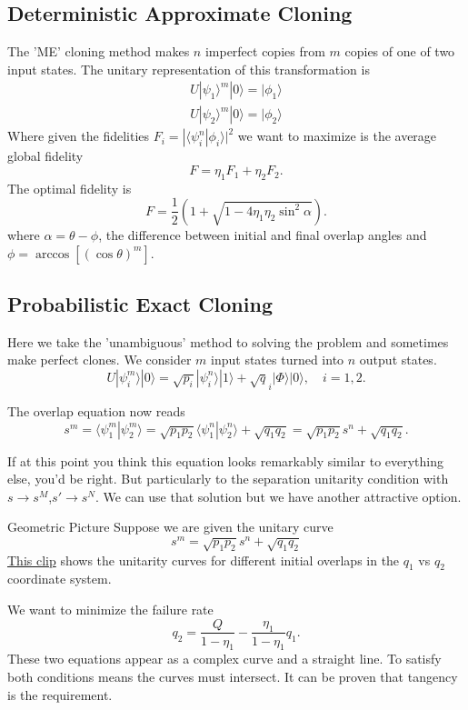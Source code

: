 \documentclass{beamer}
\newcommand{\ke}[1]{|#1\rangle}
\newcommand{\bk}[2]{\langle #1|#2\rangle}
\begin{document}
\subsection{Deterministic Approximate Cloning}
\begin{frame}
The 'ME' cloning method makes $n$ imperfect copies from $m$ copies of one of two input states.
The unitary representation of this transformation is
\begin{eqnarray*}
U \ke{\psi_1}^m\ke 0  = \ke {\phi_1}\\
U \ke{\psi_2}^m\ke 0  = \ke {\phi_2}
\end{eqnarray*}
Where given the fidelities $F_i = |\bk{\psi_i^n}{\phi_i}|^2$ we want to maximize is the average global fidelity
\[F = \eta_1 F_1 +\eta_2 F_2.\]
The optimal fidelity is
\[F = \frac{1}{2}( 1 + \sqrt{1-  4 \eta_1 \eta_2 \sin^2 \alpha}).\]
where $\alpha = \theta -\phi$, the difference between initial and final overlap angles and $\phi = \arccos \left[ (\cos \theta)^{m}\right]$.
\end{frame}
\subsection{Probabilistic Exact Cloning}
\begin{frame}
Here we take the 'unambiguous' method to solving the problem and sometimes make perfect clones.  We consider $m$ input states turned into $n$ output states.
\begin{equation*}
U|\psi^m_i\rangle|0\rangle= \sqrt{p_i}|\psi^n_i\rangle|1\rangle +\sqrt q_i |\Phi\rangle |0\rangle,\quad i=1,2. \label{Ui}
\end{equation*}

The overlap equation now reads 
\[s^m = \bk {\psi_1^m}{\psi_2^m} = \sqrt{p_1 p_2} \bk {\psi_1^n}{\psi_2^n}  + \sqrt{q_1 q_2} =\sqrt{p_1 p_2} s^n+ \sqrt{q_1 q_2}.\]

If at this point you think this equation looks remarkably similar to everything else, you'd be right. But particularly to the separation
 unitarity condition with $s \rightarrow s^M$,$s' \rightarrow s^N$.  We can use that solution but we have another attractive option.
\end{frame}


\begin{frame}{Geometric Picture}
Suppose we are given the unitary curve
\[s^m=\sqrt{p_1 p_2} s^n+ \sqrt{q_1 q_2}\]
\href{file:///C:/Users/Vadim/Documents/work/Final exam/manipulateUnitaryCondition.swf}{This clip} shows the unitarity curves for different initial overlaps 
in the $q_1$ vs $q_2$ coordinate system.

 We want to minimize the failure rate 
\[q_2= \frac{Q}{1- \eta_1} -  \frac{\eta_1}{1- \eta_1} q_1 .\] 
These two equations appear as a complex curve and a straight line.  To satisfy both conditions means the curves must intersect.
It can be proven that tangency is the requirement. 
\end{frame}
\end{document}
